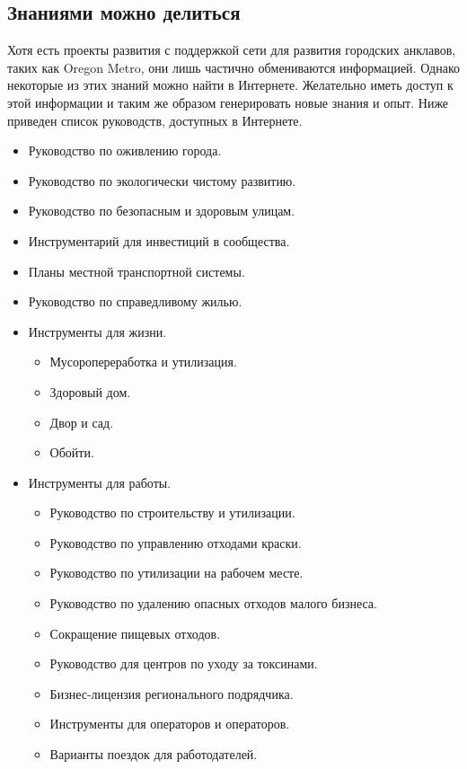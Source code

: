 \subsection{Знаниями можно делиться}
Хотя есть проекты развития с поддержкой сети для развития городских анклавов, таких как Oregon Metro, они лишь частично обмениваются информацией. Однако некоторые из этих знаний можно найти в Интернете. Желательно иметь доступ к этой информации и таким же образом генерировать новые знания и опыт. Ниже приведен список руководств, доступных в Интернете.

\begin{itemize}
    \item Руководство по оживлению города\cite{revitalization}.
    \item Руководство по экологически чистому развитию\cite{development}.
    \item Руководство по безопасным и здоровым улицам\cite{streets}.
    \item Инструментарий для инвестиций в сообщества\cite{toolkit}.
    \item Планы местной транспортной системы\cite{plans}.
    \item Руководство по справедливому жилью\cite{housing}.
    \item Инструменты для жизни\cite{living}.
    \begin{itemize}
         \item Мусоропереработка и утилизация\cite{recycling}.
         \item Здоровый дом\cite{home}.
         \item Двор и сад.
         \item Обойти\cite{around}.        
    \end{itemize}
     \item Инструменты для работы\cite{working}.
    \begin{itemize}
         \item Руководство по строительству и утилизации\cite{recycling}.
         \item Руководство по управлению отходами краски\cite{waste}.
         \item Руководство по утилизации на рабочем месте\cite{work}.
         \item Руководство по удалению опасных отходов малого бизнеса\cite{disposal}.
         \item Сокращение пищевых отходов\cite{pwaste}.
         \item Руководство для центров по уходу за токсинами\cite{centers}.
         \item Бизнес-лицензия регионального подрядчика\cite{license}.
         \item Инструменты для операторов и операторов\cite{operators}.
         \item Варианты поездок для работодателей\cite{employers}.
        

\end{itemize}
\end{itemize}
